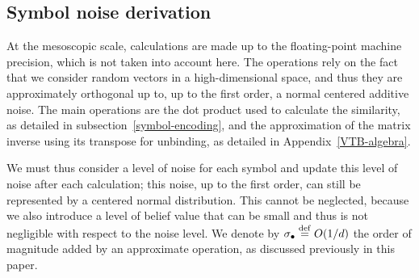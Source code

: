\documentclass[sn-mathphys]{sn-jnl}
\newcommand{\defq}{\stackrel {\rm def}{=}}
\begin{document}
\begin{appendices}
\subsection*{Symbol noise derivation}

At the mesoscopic scale, calculations are made up to the floating-point machine precision, which is not taken into account here.
The operations rely on the fact that we consider random vectors in a high-dimensional space, and thus they are approximately orthogonal up to, up to the first order, a normal centered additive noise. The main operations are the dot product used to calculate the similarity, as detailed in subsection~\ref{symbol-encoding}, and the approximation of the matrix inverse using its transpose for unbinding, as detailed in Appendix~\ref{VTB-algebra}.

We must thus consider a level of noise for each symbol and update this level of noise after each calculation; this noise, up to the first order, can still be represented by a centered normal distribution. This cannot be neglected, because we also introduce a level of belief value that can be small and thus is not negligible with respect to the noise level. We denote by $\sigma_\bullet \defq O(1/d)$ the order of magnitude added by an approximate operation, as discussed previously in this paper.


\end{appendices}
\end{document}
